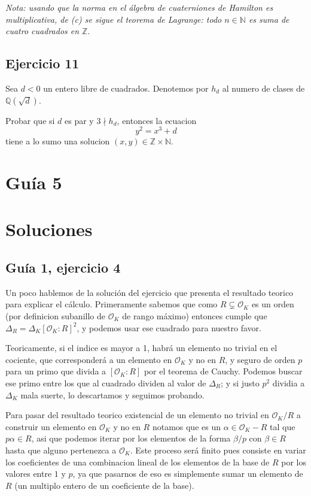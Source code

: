\documentclass[12pt]{amsart}
\newcommand{\NN}{\mathbb{N}}
\newcommand{\QQ}{\mathbb{Q}}
\newcommand{\ZZ}{\mathbb{Z}}
\newcommand{\OO}{\mathcal{O}}
\theoremstyle{plain}
\begin{document}
\textit{Nota: usando que la norma en el álgebra de cuaterniones de Hamilton es multiplicativa, de (c) se sigue el teorema de Lagrange: todo $n\in\NN$ es suma de cuatro cuadrados en $\ZZ$}.


\subsection*{Ejercicio 11} Sea $d<0$ un entero libre de cuadrados. Denotemos por $h_d$ al numero de clases de $\QQ(\sqrt{d})$.

Probar que si $d$ es par y $3 \nmid h_d$, entonces la ecuacion
$$y^2=x^3+d$$
tiene a lo sumo una solucion $(x,y)\in\ZZ\times\NN$.

\section*{Guía 5}



\newpage

\section*{Soluciones}

\subsection*{Guía 1, ejercicio 4}
Un poco hablemos de la solución del ejercicio que presenta el resultado
teorico para explicar el cálculo. Primeramente sabemos que como 
$R \subsetneq \OO_K$ es un orden (por definicion subanillo de $\OO_K$
de rango máximo) entonces cumple que $\Delta_R = \Delta_K [\OO_K:R]^2$, y podemos usar ese cuadrado para nuestro favor. 

Teoricamente, si el indice es mayor a 1, habrá un elemento no trivial en el cociente, que corresponderá a un elemento en $\OO_K$ y no en $R$, y seguro de orden $p$ para un primo que divida a $[\OO_K:R]$ por el teorema de Cauchy. Podemos buscar ese primo entre los que al cuadrado dividen al valor de $\Delta_R$; y si justo $p^2$ dividia a $\Delta_K$ mala suerte, lo descartamos y seguimos probando.

Para pasar del resultado teorico existencial de un elemento no trivial en $\OO_K/R$ a construir un elemento en $\OO_K$ y no en $R$ notamos que es un $\alpha \in \OO_K - R$ tal que $p\alpha \in R$, asi que podemos iterar por los elementos de la forma $\beta /p$ con $\beta\in R$ hasta que alguno pertenezca a $\OO_K$. Este proceso será finito pues consiste en variar los coeficientes de una combinacion lineal de los elementos de la base de $R$ por los valores entre $1$ y $p$, ya que pasarnos de eso es simplemente sumar un elemento de $R$ (un multiplo entero de un coeficiente de la base).
\end{document}
